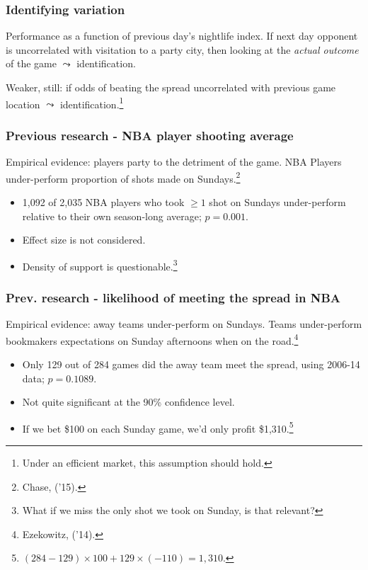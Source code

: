 \documentclass{beamer}
\begin{document}
\begin{frame}   \frametitle{Identifying variation}
  \begin{block}{Performance as a function of previous day's nightlife index.}     If next day opponent is uncorrelated with visitation to a party city,
    then looking at the \emph{actual outcome} of the game $\leadsto$ identification.

    \vspace{15pt} 

    Weaker, still: if odds of beating the spread uncorrelated with previous game location
    $\leadsto$ identification.\footnote{Under an efficient market, this assumption should hold.}       \end{block}
\end{frame}


\begin{frame}
  \frametitle{Previous research - NBA player shooting average}
  \begin{block}{Empirical evidence: players party to the detriment of the game.}
  NBA Players under-perform proportion of shots made on Sundays.\footnote{Chase, ('15).}
  \end{block}
    \begin{itemize}       
    \item 1,092 of 2,035 NBA players who took $\geq 1$ shot on Sundays under-perform 
      relative to their own season-long average; $p=0.001$.
      \item Effect size is not considered.
      \item Density of support is questionable.\footnote{What if we miss the only shot we took on Sunday, is that relevant?}     \end{itemize}
\end{frame}

\begin{frame}   \frametitle{Prev. research - likelihood of meeting the spread in NBA}
  \begin{block}{Empirical evidence: away teams under-perform on Sundays.}
  Teams under-perform bookmakers expectations on Sunday afternoons when on the road.\footnote{Ezekowitz, ('14).}
    \begin{itemize}       
    \item Only 129 out of 284 games did the away team meet the spread, 
      using 2006-14 data; $p=0.1089$.
    \item Not quite significant at the 90\% confidence level.     
    \item If we bet \$100 on each Sunday game, we'd only profit \$1,310.\footnote{$(284 - 129) \times 100 + 129 \times (-110) = 1,310$.} 
    \end{itemize}
  \end{block}
  \end{frame}
\end{document}
